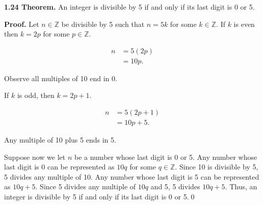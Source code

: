 \documentclass[12pt]{article}
\begin{document}
\noindent\textbf{1.24 Theorem.} An integer is divisible by 5 if and only if its last digit is 0 or 5.

\bigskip

\noindent\textbf{Proof.} Let $n\in\mathbb{Z}$ be divisible by 5 such that $n=5k$ for some $k\in\mathbb{Z}$. If $k$ is even then $k=2p$ for some $p\in\mathbb{Z}$.
 
\begin{align*}
n &= 5(2p)\\
&= 10p.
\end{align*}

\noindent Observe all multiples of 10 end in 0.

\bigskip

\noindent If $k$ is odd, then $k=2p+1$.

\begin{align*}
n &= 5(2p+1)\\
&= 10p + 5.
\end{align*}

\noindent Any multiple of 10 plus 5 ends in 5.

\bigskip

\noindent Suppose now we let $n$ be a number whose last digit is 0 or 5. Any number whose last digit is 0 can be represented as $10q$ for some $q\in\mathbb{Z}$. Since 10 is divisible by 5, 5 divides any multiple of 10. Any number whose last digit is 5 can be represented as $10q+5$. Since 5 divides any multiple of $10q$ and 5, 5 divides $10q+5$. Thus, an integer is divisible by 5 if and only if its last digit is 0 or 5.\qed
\end{document}
